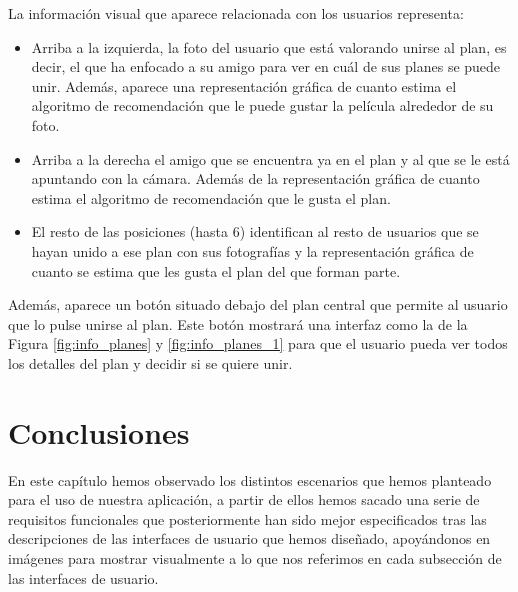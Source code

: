 La información visual que aparece relacionada con los usuarios representa:
\begin{itemize}
    \item Arriba a la izquierda, la foto del usuario que está valorando unirse al plan, es decir, el que ha enfocado a su amigo para ver en cuál de sus planes se puede unir. Además, aparece una representación 
    gráfica de cuanto estima el algoritmo de recomendación que le puede gustar la película alrededor de su foto.
    \item Arriba a la derecha el amigo que se encuentra ya en el plan y al que se le está apuntando con la cámara. Además de la representación gráfica de cuanto estima el algoritmo de recomendación que le gusta el plan.
    \item El resto de las posiciones (hasta 6) identifican al resto de usuarios que se hayan unido a ese plan con sus fotografías y la representación gráfica de cuanto se estima que les gusta el plan del que forman parte.
\end{itemize}
Además, aparece un botón situado debajo del plan central que permite al usuario que lo pulse unirse al 
plan. Este botón mostrará una interfaz como la de la Figura \ref{fig:info_planes} y \ref{fig:info_planes_1} para que el usuario pueda ver todos 
los detalles del plan y decidir si se quiere unir.

\section{Conclusiones}

En este capítulo hemos observado los distintos escenarios que hemos planteado para el uso de nuestra aplicación, a partir de ellos hemos sacado una serie de 
 requisitos funcionales que posteriormente han sido mejor especificados tras las descripciones de las interfaces de usuario que hemos diseñado, apoyándonos en imágenes 
 para mostrar visualmente a lo que nos referimos en cada subsección de las interfaces de usuario.



